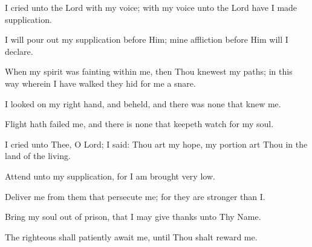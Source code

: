 I cried unto the Lord with my voice; with my voice unto the Lord have I made supplication.

I will pour out my supplication before Him; mine affliction before Him will I declare.

When my spirit was fainting within me, then Thou knewest my paths; in this way wherein I have walked they hid for me a snare.

I looked on my right hand, and beheld, and there was none that knew me.

Flight hath failed me, and there is none that keepeth watch for my soul.

I cried unto Thee, O Lord; I said: Thou art my hope, my portion art Thou in the land of the living.

Attend unto my supplication, for I am brought very low.

Deliver me from them that persecute me; for they are stronger than I.

Bring my soul out of prison, that I may give thanks unto Thy Name.

The righteous shall patiently await me, until Thou shalt reward me.
